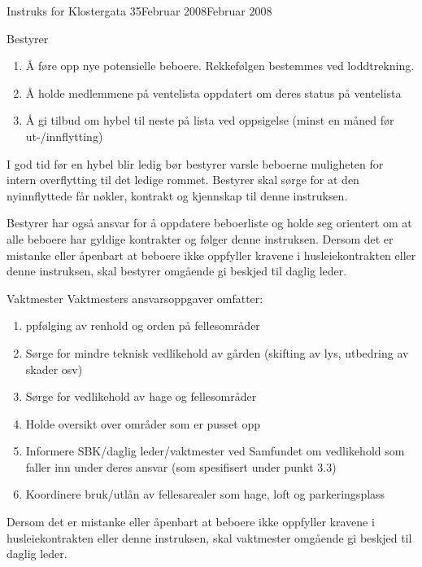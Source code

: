 \documentclass[fsbok.tex]{subfiles}
\begin{document}
\begin{instruks}{Instruks for Klostergata 35}{Februar 2008}{Februar 2008}
\begin{instruksledd}{Bestyrer}
        \begin{enumerate}
            \item Å føre opp nye potensielle beboere. Rekkefølgen bestemmes ved loddtrekning.
            \item Å holde medlemmene på ventelista oppdatert om deres status på ventelista
            \item Å gi tilbud om hybel til neste på lista ved oppsigelse (minst en måned før
                ut-/innflytting)
        \end{enumerate}

        I god tid før en hybel blir ledig bør bestyrer varsle beboerne muligheten for
        intern overflytting til det ledige rommet.
        Bestyrer skal sørge for at den nyinnflyttede får nøkler, kontrakt og kjennskap til
        denne instruksen.

        Bestyrer har også ansvar for å oppdatere beboerliste og holde seg orientert om at
        alle beboere har gyldige kontrakter
        og følger denne instruksen. Dersom det er mistanke eller åpenbart at beboere ikke
        oppfyller kravene i
        husleiekontrakten eller denne instruksen, skal bestyrer omgående gi beskjed til
        daglig leder.

    \end{instruksledd}

    \begin{instruksledd}{Vaktmester}
        Vaktmesters ansvarsoppgaver omfatter:
        \begin{enumerate}
            \item ppfølging av renhold og orden på fellesområder
            \item Sørge for mindre teknisk vedlikehold av gården (skifting av lys,
                utbedring av skader osv)
            \item Sørge for vedlikehold av hage og fellesområder
            \item Holde oversikt over områder som er pusset opp
            \item Informere SBK/daglig leder/vaktmester ved Samfundet om vedlikehold som
                faller inn under deres ansvar
                (som spesifisert under punkt 3.3)
            \item Koordinere bruk/utlån av fellesarealer som hage, loft og
                parkeringsplass
        \end{enumerate}
        Dersom det er mistanke eller åpenbart at beboere ikke oppfyller kravene i
        husleiekontrakten eller denne instruksen,
        skal vaktmester omgående gi beskjed til daglig leder.
    \end{instruksledd}


\end{instruks}
\end{document}

